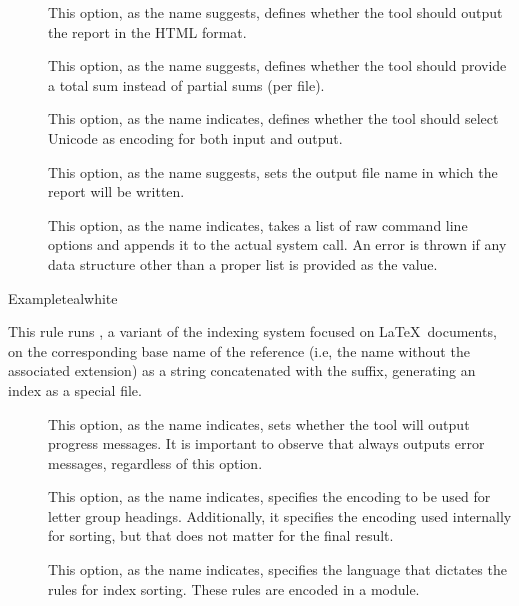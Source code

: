 \begin{description}
\begin{description}
\item[] This option, as the name suggests, defines whether the tool should output the report in the HTML format.

\item[] This option, as the name suggests, defines whether the tool should provide a total sum instead of partial sums (per file).

\item[] This option, as the name indicates, defines whether the tool should select Unicode as encoding for both input and output.

\item[] This option, as the name suggests, sets the output file name in which the report will be written.

\item[] This option, as the name indicates, takes a list of raw command line options and appends it to the actual system call. An error is thrown if any data structure other than a proper list is provided as the value.
\end{description}

\begin{codebox}{Example}{teal}{\icnote}{white}
\end{codebox}

\item[\rulebox{texindy}]
This rule runs , a variant of the  indexing system focused on \LaTeX\ documents, on the corresponding base name of the  reference (i.e, the name without the associated extension) as a string concatenated with the  suffix, generating an index as a special  file.

\begin{description}
\item[] This option, as the name indicates, sets whether the tool will output progress messages. It is important to observe that  always outputs error messages, regardless of this option.

\item[] This option, as the name indicates, specifies the encoding to be used for letter group headings. Additionally, it specifies the encoding used internally for sorting, but that does not matter for the final result.

\item[] This option, as the name indicates, specifies the language that dictates the rules for index sorting. These rules are encoded in a module.


\end{description}
\end{description}
